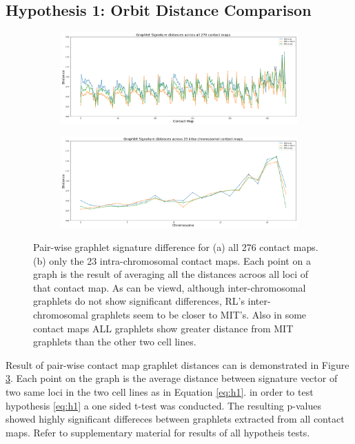 \documentclass[a4,center,fleqn]{NAR}
\begin{document}
\subsection{Hypothesis 1: Orbit Distance Comparison}
\begin{figure}[t]
    \centering
    \begin{subfigure}[b]{\textwidth}
        \includegraphics[width=\textwidth]{figures/orbit-distances_all.png}
        \caption{}
        \label{fig:orbit-distances_all}
    \end{subfigure}

    \begin{subfigure}[b]{\textwidth}
        \includegraphics[width=\textwidth]{figures/orbit-distances_intra.png}
        \caption{}
        \label{fig:orbit-distances_intra}
    \end{subfigure}
    \caption{   Pair-wise graphlet signature difference for
                (a) all 276 contact maps.
                (b) only the 23 intra-chromosomal contact maps.
                Each point on a graph is the result of averaging all
                the distances acroos all loci of that contact map.
                As can be viewd, although inter-chromosomal graphlets 
                do not show significant differences, RL's inter-chromosomal
                graphlets seem to be closer to MIT's. Also in some contact
                maps ALL graphlets show greater distance from MIT graphlets
                than the other two cell lines.
             }
    \label{fig:orbit-distances}
\end{figure}
Result of pair-wise contact map graphlet distances can is
demonstrated in Figure \ref{fig:orbit-distances}.
Each point on the graph is the
average distance between signature vector of two same loci 
in the two cell lines as in Equation \ref{eq:h1}.
in order to test hypothesis \ref{eq:h1} a one sided t-test
was conducted. The resulting p-values showed highly significant differeces
between graphlets extracted from all contact maps. Refer to supplementary
material for results of all hypotheis tests.
\end{document}
